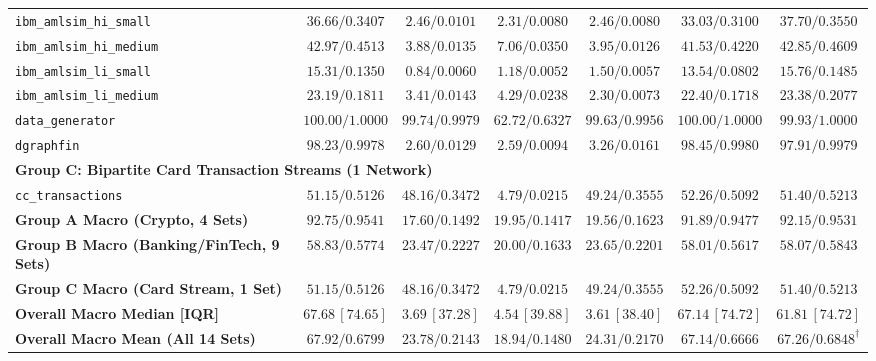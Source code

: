 \begin{table}[t]
{\begin{tabular}{lcccccc}
\texttt{ibm\_amlsim\_hi\_small} & $36.66 / 0.3407$ & $2.46 / 0.0101$ & $2.31 / 0.0080$ & $2.46 / 0.0080$ & $33.03 / 0.3100$ & $\mathbf{37.70 / 0.3550}$ \\
\texttt{ibm\_amlsim\_hi\_medium} & $42.97 / 0.4513$ & $3.88 / 0.0135$ & $7.06 / 0.0350$ & $3.95 / 0.0126$ & $41.53 / 0.4220$ & $\mathbf{42.85 / 0.4609}$ \\
\texttt{ibm\_amlsim\_li\_small} & $15.31 / 0.1350$ & $0.84 / 0.0060$ & $1.18 / 0.0052$ & $1.50 / 0.0057$ & $13.54 / 0.0802$ & $\mathbf{15.76 / 0.1485}$ \\
\texttt{ibm\_amlsim\_li\_medium} & $23.19 / 0.1811$ & $3.41 / 0.0143$ & $4.29 / 0.0238$ & $2.30 / 0.0073$ & $22.40 / 0.1718$ & $\mathbf{23.38 / 0.2077}$ \\
\texttt{data\_generator} & $100.00 / 1.0000$ & $99.74 / 0.9979$ & $62.72 / 0.6327$ & $99.63 / 0.9956$ & $100.00 / 1.0000$ & $\mathbf{99.93 / 1.0000}$ \\
\texttt{dgraphfin} & $98.23 / 0.9978$ & $2.60 / 0.0129$ & $2.59 / 0.0094$ & $3.26 / 0.0161$ & $98.45 / 0.9980$ & $\mathbf{97.91 / 0.9979}$ \\
\midrule
\multicolumn{7}{l}{\textbf{Group C: Bipartite Card Transaction Streams (1 Network)}} \\
\texttt{cc\_transactions} & $51.15 / 0.5126$ & $48.16 / 0.3472$ & $4.79 / 0.0215$ & $49.24 / 0.3555$ & $52.26 / 0.5092$ & $\mathbf{51.40 / 0.5213}$ \\
\midrule
\textbf{Group A Macro (Crypto, 4 Sets)} & $92.75 / 0.9541$ & $17.60 / 0.1492$ & $19.95 / 0.1417$ & $19.56 / 0.1623$ & $91.89 / 0.9477$ & $\mathbf{92.15 / 0.9531}$ \\
\textbf{Group B Macro (Banking/FinTech, 9 Sets)} & $58.83 / 0.5774$ & $23.47 / 0.2227$ & $20.00 / 0.1633$ & $23.65 / 0.2201$ & $58.01 / 0.5617$ & $\mathbf{58.07 / 0.5843}$ \\
\textbf{Group C Macro (Card Stream, 1 Set)} & $51.15 / 0.5126$ & $48.16 / 0.3472$ & $4.79 / 0.0215$ & $49.24 / 0.3555$ & $52.26 / 0.5092$ & $\mathbf{51.40 / 0.5213}$ \\
\midrule
\textbf{Overall Macro Median [IQR]} & $67.68\,[74.65]$ & $3.69\,[37.28]$ & $4.54\,[39.88]$ & $3.61\,[38.40]$ & $67.14\,[74.72]$ & $\mathbf{61.81\,[74.72]}$ \\
\textbf{Overall Macro Mean (All 14 Sets)} & $67.92 / 0.6799$ & $23.78 / 0.2143$ & $18.94 / 0.1480$ & $24.31 / 0.2170$ & $67.14 / 0.6666$ & $\mathbf{67.26 / 0.6848}^\dagger$ \\
\bottomrule
\end{tabular}%
}
\end{table}
